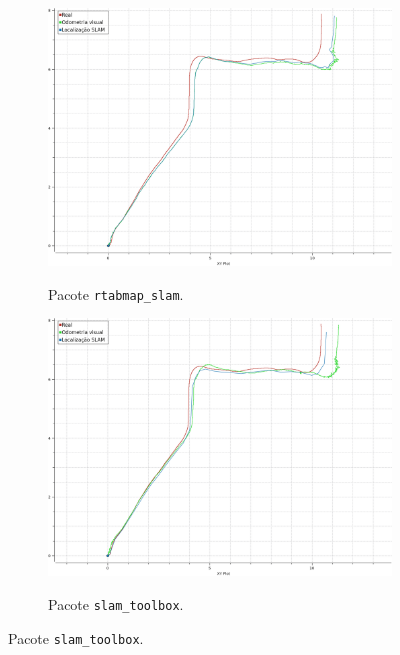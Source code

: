 \documentclass[repeatfields,xlists,xpacks,oneside,yearsonly]{ufrgscca}
\begin{document}
\begin{figure}[h]
    \caption{Sistemas de localização}
    \begin{subfigure}{0.5\linewidth}
        {
            \centering
            \caption{Pacote \texttt{rtabmap\_slam}.}
            \label{fig:localization_rtabmap}
            \includegraphics[width=0.98\linewidth]{localization-rtabmap.png}\\
        }
    \end{subfigure}
    \begin{subfigure}{0.5\linewidth}
        {
            \centering
            \caption{Pacote \texttt{slam\_toolbox}.}
            \label{fig:localization_slam_toolbox}
            \includegraphics[width=0.98\linewidth]{localization-slam-toolbox.png}\\
        }
    \end{subfigure}
\end{figure}
\end{document}
